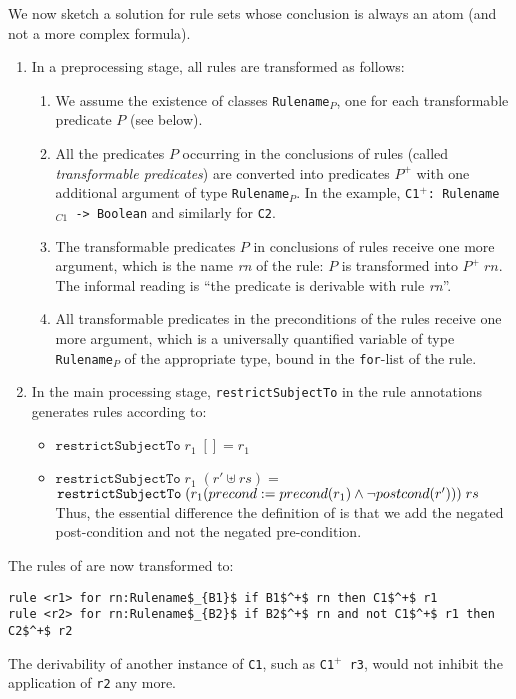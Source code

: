 We now sketch a solution for rule sets whose conclusion is always an atom (and
not a more complex formula).

\begin{enumerate}
\item In a preprocessing stage, all rules are transformed as follows:
  \begin{enumerate}
  \item We assume the existence of classes \texttt{Rulename$_P$}, one for each
    transformable predicate $P$ (see below).
  \item All the predicates $P$
    occurring in the conclusions of rules (called \emph{transformable
      predicates}) are converted into predicates $P^+$ with one additional
    argument of type \texttt{Rulename$_P$}. In the
    example, \texttt{C1$^+$: Rulename$_{C1}$ -> Boolean} and similarly for \texttt{C2}.
  \item The transformable predicates $P$ in conclusions of rules receive one
    more argument, which is the name \emph{rn} of the rule: $P$ is transformed
    into $P^+\; rn$. The informal reading is ``the predicate is derivable with
    rule \emph{rn}''.
  \item All transformable predicates in the preconditions of the rules receive
    one more argument, which is a universally quantified variable of type
    \texttt{Rulename$_P$} of the appropriate type, bound in the
    \texttt{for}-list of the rule.
  \end{enumerate}
\item In the main processing stage, \texttt{restrictSubjectTo} in the rule
  annotations generates rules according to:
  \begin{itemize}
\item $\mathtt{restrictSubjectTo}\; r_1\; [] = r_1$
\item $\mathtt{restrictSubjectTo}\; r_1\; (r' \uplus rs) =$\\
  $\mathtt{restrictSubjectTo}\; (r_1(precond := precond(r_1) \land \lnot postcond(r')))\; rs$
  Thus, the essential difference \wrt{} the definition of
   is that we add the negated post-condition and not
  the negated pre-condition.
\end{itemize}
\end{enumerate}

\begin{example} The rules of  are now
  transformed to:
\begin{lstlisting}[mathescape=true]
rule <r1> for rn:Rulename$_{B1}$ if B1$^+$ rn then C1$^+$ r1
rule <r2> for rn:Rulename$_{B2}$ if B2$^+$ rn and not C1$^+$ r1 then C2$^+$ r2
\end{lstlisting}
The derivability of another instance of \texttt{C1}, such as \texttt{C1$^+$ r3},
would not inhibit the application of \texttt{r2} any more.
\end{example}


